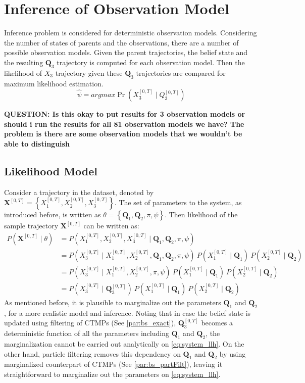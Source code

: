 \section{Inference of Observation Model}
Inference problem is considered for deterministic observation models. Considering the number of states of parents and the observations, there are a number of possible observation models. Given the parent trajectories, the belief state and the resulting $ \textbf{Q}_3 $ trajectory is computed for each observation model. Then the likelihood of $ X_3 $ trajectory given these  $ \textbf{Q}_3 $  trajectories are compared for maximum likelihood estimation.
\begin{equation}
\hat{\psi} = argmax \operatorname{Pr}(X_3^{[0,T]} \mid Q_3^{[0,T]})
\end{equation}

\textbf{QUESTION: Is this okay to put results for 3 observation models or should i run the results for all 81 observation models we have? The problem is there are some observation models that we wouldn't be able to distinguish}
\subsection{Likelihood Model}
Consider a trajectory in the dataset, denoted by $ \textbf{X}^{[0,T]} = \left\lbrace X_1^{[0,T]} , X_2^{[0,T]}, X_3^{[0,T]}\right\rbrace $. The set of parameters to the system, as introduced before, is written as $  \theta = \left\lbrace  \textbf{Q}_{1}, \textbf{Q}_{2}, \pi, \psi \right\rbrace $. Then likelihood of the sample trajectory $ \textbf{X}^{[0,T]} $ can be written as:
\begin{align}
P(\textbf{X}^{[0,T]} \mid \theta ) & = P(X_{1}^{[0, T]}, X_{2}^{[0, T]}, X_{3}^{[0, T]} \mid \textbf{Q}_{1}, \textbf{Q}_{2}, \pi, \psi) \nonumber\\
& = P(X_{3}^{[0, T]} \mid X_{1}^{[0, T]}, X_{2}^{[0, T]}, \textbf{Q}_{1}, \textbf{Q}_{2}, \pi, \psi) \ P(X_{1}^{[0, T]}\mid \textbf{Q}_{1}) \ P(X_{2}^{[0, T]}\mid \textbf{Q}_{2}) \nonumber\\ & = P(X_{3}^{[0, T]} \mid X_{1}^{[0, T]}, X_{2}^{[0, T]}, \pi, \psi) \ P(X_{1}^{[0, T]}\mid \textbf{Q}_{1}) \ P(X_{2}^{[0, T]}\mid \textbf{Q}_{2}) \nonumber\\ & = P(X_{3}^{[0, T]}\mid \textbf{Q}_{3}^{[0, T]}) \ P(X_{1}^{[0, T]}\mid \textbf{Q}_{1}) \ P(X_{2}^{[0, T]}\mid \textbf{Q}_{2}) 
\label{eq:system_llh}
\end{align}
As mentioned before, it is plausible to marginalize out the parameters $ \textbf{Q}_1 $ and $ \textbf{Q}_2 $, for a more realistic model and inference. Noting that in case the belief state is updated using filtering of CTMPs (See \cref{par:bs_exact}), $ \textbf{Q}_{3}^{[0, T]} $ becomes a deterministic function of all the parameters including $ \textbf{Q}_1 $ and $ \textbf{Q}_2 $, the marginalization cannot be carried out analytically on \autoref{eq:system_llh}. On the other hand, particle filtering removes this dependency on $ \textbf{Q}_1 $ and $ \textbf{Q}_2 $ by using marginalized counterpart of CTMPs (See \cref{par:bs_partFilt}), leaving it straightforward to marginalize out the parameters on \autoref{eq:system_llh}.

